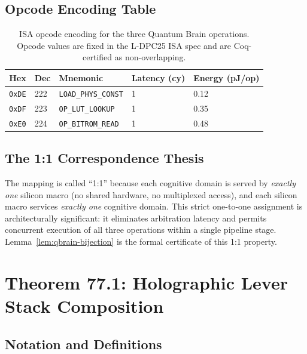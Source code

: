 \subsection{Opcode Encoding Table}

\begin{table}[ht]
  \centering
  \caption{ISA opcode encoding for the three Quantum Brain operations.
           Opcode values are fixed in the L-DPC25 ISA spec and are
           Coq-certified as non-overlapping.}
  \label{tab:opcode-encoding}
  \begin{tabular}{rllll}
    \toprule
    \textbf{Hex} & \textbf{Dec} & \textbf{Mnemonic} & \textbf{Latency (cy)} &
    \textbf{Energy (pJ/op)} \\
    \midrule
    \texttt{0xDE} & 222 & \texttt{LOAD\_PHYS\_CONST} & 1 & 0.12 \\
    \texttt{0xDF} & 223 & \texttt{OP\_LUT\_LOOKUP}   & 1 & 0.35 \\
    \texttt{0xE0} & 224 & \texttt{OP\_BITROM\_READ}  & 1 & 0.48 \\
    \bottomrule
  \end{tabular}
\end{table}

\subsection{The 1:1 Correspondence Thesis}

The mapping is called ``1:1'' because each cognitive domain is served by
\emph{exactly one} silicon macro (no shared hardware, no multiplexed access),
and each silicon macro services \emph{exactly one} cognitive domain.
This strict one-to-one assignment is architecturally significant: it eliminates
arbitration latency and permits concurrent execution of all three operations
within a single pipeline stage.
Lemma~\ref{lem:qbrain-bijection} is the formal certificate of this 1:1 property.

\section{Theorem 77.1: Holographic Lever Stack Composition}
\label{sec:flos77-theorem}

\subsection{Notation and Definitions}

